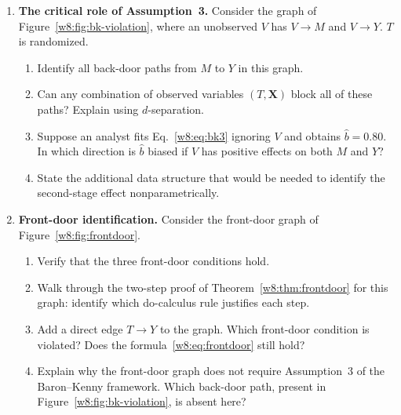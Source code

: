 \documentclass[master.tex]{subfiles}
\begin{document}
\begin{enumerate}[label=\textbf{\arabic*.}, leftmargin=*, itemsep=10pt]
  \item \textbf{The critical role of Assumption~3.}
  Consider the graph of Figure~\ref{w8:fig:bk-violation}, where an
  unobserved $V$ has $V \to M$ and $V \to Y$.  $T$ is randomized.
  \begin{enumerate}[label=(\alph*)]
    \item Identify all back-door paths from $M$ to $Y$ in this graph.
    \item Can any combination of observed variables $(T, \mathbf{X})$
      block all of these paths?  Explain using $d$-separation.
    \item Suppose an analyst fits Eq.~\eqref{w8:eq:bk3} ignoring $V$
      and obtains $\hat b = 0.80$.  In which direction is $\hat b$
      biased if $V$ has positive effects on both $M$ and $Y$?
    \item State the additional data structure that would be needed to
      identify the second-stage effect nonparametrically.
  \end{enumerate}

  \item \textbf{Front-door identification.}
  Consider the front-door graph of Figure~\ref{w8:fig:frontdoor}.
  \begin{enumerate}[label=(\alph*)]
    \item Verify that the three front-door conditions hold.
    \item Walk through the two-step proof of Theorem~\ref{w8:thm:frontdoor}
      for this graph: identify which do-calculus rule justifies each
      step.
    \item Add a direct edge $T \to Y$ to the graph.  Which front-door
      condition is violated?  Does the formula~\eqref{w8:eq:frontdoor}
      still hold?
    \item Explain why the front-door graph does not require
      Assumption~3 of the Baron--Kenny framework.  Which back-door
      path, present in Figure~\ref{w8:fig:bk-violation}, is absent here?
  \end{enumerate}


\end{enumerate}
\end{document}
